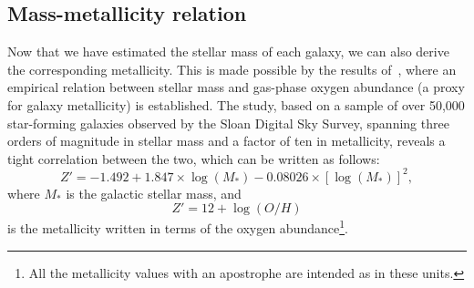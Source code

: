 \subsection{Mass-metallicity relation}
Now that we have estimated the stellar mass of each galaxy, we can also derive the corresponding metallicity.
This is made possible by the results of~\cite{Tremonti}, where an empirical relation between stellar mass and gas-phase oxygen abundance (a proxy for galaxy metallicity) is established.
The study, based on a sample of over 50,000 star-forming galaxies observed by the Sloan Digital Sky Survey, spanning three orders of magnitude in stellar mass and a factor of ten in metallicity, reveals a tight correlation between the two, which can be written as follows:
\begin{equation}
    Z' = -1.492 + 1.847\times\log(M_*) - 0.08026\times{[\log(M_*)]}^2,
    \label{eq: mass to metallicity relation}
\end{equation}
where $M_*$ is the galactic stellar mass, and 
\begin{equation}
    Z'= 12+\log(O/H)
    \label{eq: metalliticy weird units definition}
\end{equation}
is the metallicity written in terms of the oxygen abundance\footnote{All the metallicity values with an apostrophe are intended as in these units.}.

